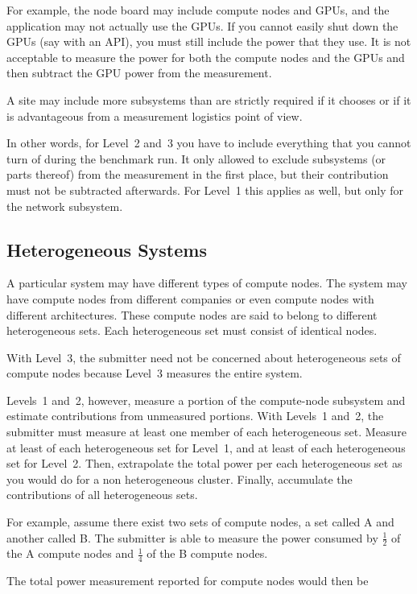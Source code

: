 For example, the node board may include compute nodes and GPUs, and the application may not actually use the GPUs.
If you cannot easily shut down the GPUs (say with an API), you must still include the power that they use.
It is not acceptable to measure the power for both the compute nodes and the GPUs and then subtract the GPU power from the measurement.

A site may include more subsystems than are strictly required if it chooses or if it is advantageous from a measurement logistics point of view.

In other words, for Level~2 and~3 you have to include everything that you cannot turn of during the benchmark run.
It only allowed to exclude subsystems (or parts thereof) from the measurement in the first place, but their contribution must not be subtracted afterwards.
For Level~1 this applies as well, but only for the network subsystem.

\subsection{Heterogeneous Systems}

A particular system may have different types of compute nodes.
The system may have compute nodes from different companies or even compute nodes with different architectures.
These compute nodes are said to belong to different heterogeneous sets.
Each heterogeneous set must consist of identical nodes.

With Level~3, the submitter need not be concerned about heterogeneous sets of compute nodes because Level~3 measures the entire system.

Levels~1 and~2, however, measure a portion of the compute-node subsystem and estimate contributions from unmeasured portions.
With Levels~1 and~2, the submitter must measure at least one member of each heterogeneous set.
Measure at least \SpecFracMinLOne{} of each heterogeneous set for Level~1, and at least \SpecFracMinLTwo{} of each heterogeneous set for Level~2.
Then, extrapolate the total power per each heterogeneous set as you would do for a non heterogeneous cluster.
Finally, accumulate the contributions of all heterogeneous sets.

For example, assume there exist two sets of compute nodes, a set called A and another called B.
The submitter is able to measure the power 
consumed by $\frac{1}{2} $ of the A compute nodes and $\frac{1}{4}$ of the B compute nodes.

The total power measurement reported for compute nodes would then be 


